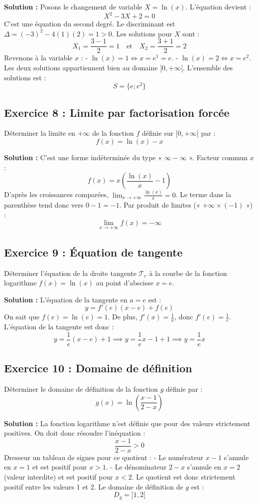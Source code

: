 \textbf{Solution :}
Posons le changement de variable $X = \ln(x)$. L'équation devient :
\[
X^2 - 3X + 2 = 0
\]
C'est une équation du second degré. Le discriminant est $\Delta = (-3)^2 - 4(1)(2) = 1 > 0$.
Les solutions pour $X$ sont :
\[
X_1 = \frac{3-1}{2} = 1 \quad \text{et} \quad X_2 = \frac{3+1}{2} = 2
\]
Revenons à la variable $x$ :
- $\ln(x) = 1 \iff x = e^1 = e$.
- $\ln(x) = 2 \iff x = e^2$.
Les deux solutions appartiennent bien au domaine $]0, +\infty[$.
L'ensemble des solutions est :
\[
S = \{e; e^2\}
\]

\subsection*{Exercice 8 : Limite par factorisation forcée}
Déterminer la limite en $+\infty$ de la fonction $f$ définie sur $]0, +\infty[$ par :
\[
f(x) = \ln(x) - x
\]

\textbf{Solution :}
C'est une forme indéterminée du type « $\infty - \infty$ ». Facteur commun $x$ :
\[
f(x) = x \left( \frac{\ln(x)}{x} - 1 \right)
\]
D'après les croissances comparées, $\lim_{x \to +\infty} \frac{\ln(x)}{x} = 0$.
Le terme dans la parenthèse tend donc vers $0-1 = -1$.
Par produit de limites (« $+\infty \times (-1)$ ») :
\[
\lim_{x \to +\infty} f(x) = -\infty
\]

\subsection*{Exercice 9 : Équation de tangente}
Déterminer l'équation de la droite tangente $\mathcal{T}_e$ à la courbe de la fonction logarithme $f(x) = \ln(x)$ au point d'abscisse $x=e$.

\textbf{Solution :}
L'équation de la tangente en $a = e$ est :
\[
y = f'(e)(x-e) + f(e)
\]
On sait que $f(e) = \ln(e) = 1$.
De plus, $f'(x) = \frac{1}{x}$, donc $f'(e) = \frac{1}{e}$.
L'équation de la tangente est donc :
\[
y = \frac{1}{e}(x-e) + 1 \implies y = \frac{1}{e}x - 1 + 1 \implies y = \frac{1}{e}x
\]

\subsection*{Exercice 10 : Domaine de définition}
Déterminer le domaine de définition de la fonction $g$ définie par :
\[
g(x) = \ln\left( \frac{x-1}{2-x} \right)
\]

\textbf{Solution :}
La fonction logarithme n'est définie que pour des valeurs strictement positives. On doit donc résoudre l'inéquation :
\[
\frac{x-1}{2-x} > 0
\]
Dresseur un tableau de signes pour ce quotient :
- Le numérateur $x-1$ s'annule en $x=1$ et est positif pour $x > 1$.
- Le dénominateur $2-x$ s'annule en $x=2$ (valeur interdite) et est positif pour $x < 2$.
Le quotient est donc strictement positif entre les valeurs 1 et 2.
Le domaine de définition de $g$ est :
\[
D_g = ]1, 2[
\]

